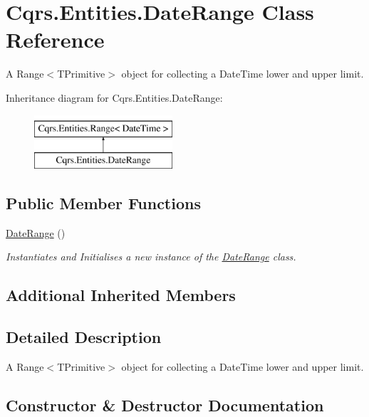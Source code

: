 \hypertarget{classCqrs_1_1Entities_1_1DateRange}{}\section{Cqrs.\+Entities.\+Date\+Range Class Reference}
\label{classCqrs_1_1Entities_1_1DateRange}


A Range$<$\+T\+Primitive$>$ object for collecting a Date\+Time lower and upper limit.  


Inheritance diagram for Cqrs.\+Entities.\+Date\+Range\+:\begin{figure}[H]
\begin{center}
\leavevmode
\includegraphics[height=2.000000cm]{classCqrs_1_1Entities_1_1DateRange}
\end{center}
\end{figure}
\subsection*{Public Member Functions}
\begin{DoxyCompactItemize}
\item 
\hyperlink{classCqrs_1_1Entities_1_1DateRange_adc6535de6e11720964fd355281444721_adc6535de6e11720964fd355281444721}{Date\+Range} ()
\begin{DoxyCompactList}\small\item\em Instantiates and Initialises a new instance of the \hyperlink{classCqrs_1_1Entities_1_1DateRange}{Date\+Range} class. \end{DoxyCompactList}\end{DoxyCompactItemize}
\subsection*{Additional Inherited Members}


\subsection{Detailed Description}
A Range$<$\+T\+Primitive$>$ object for collecting a Date\+Time lower and upper limit. 



\subsection{Constructor \& Destructor Documentation}
\mbox{\label{classCqrs_1_1Entities_1_1DateRange_adc6535de6e11720964fd355281444721_adc6535de6e11720964fd355281444721}} 

